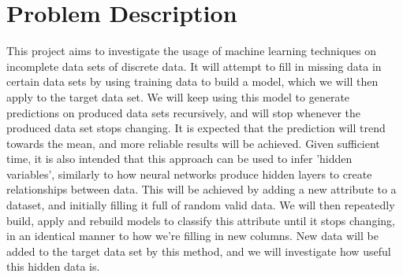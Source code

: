 \section{Problem Description} This project aims to investigate the usage of machine learning techniques on incomplete data sets of discrete data. It will attempt to fill in missing data in certain data sets by using training data to build a model, which we will then apply to the target data set. We will keep using this model to generate predictions on produced data sets recursively, and will stop whenever the produced data set stops changing. It is expected that the prediction will trend towards the mean, and more reliable results will be achieved.  Given sufficient time, it is also intended that this approach can be used to infer 'hidden variables', similarly to how neural networks produce hidden layers to create relationships between data. This will be achieved by adding a new attribute to a dataset, and initially filling it full of random valid data. We will then repeatedly build, apply and rebuild models to classify this attribute until it stops changing, in an identical manner to how we’re filling in new columns. New data will be added to the target data set by this method, and we will investigate how useful this hidden data is. 

